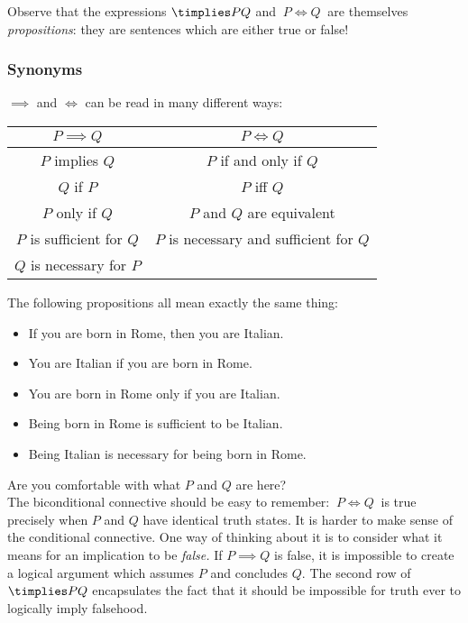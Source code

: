 \noindent Observe that the expressions $\timplies PQ$ and $\ P\iff Q\ $ are themselves \emph{propositions}: they are sentences which are either true or false!

\subsubsection*{Synonyms}

$\implies$ and $\iff$ can be read in many different ways:
\begin{center}
\begin{tabular}{c|c}
$P\implies Q$ & $P\iff Q$\\\hline
$P$ implies $Q$ & $P$ if and only if $Q$\\
$Q$ if $P$ & $P$ iff $Q$\\
$P$ only if $Q$ & $P$ and $Q$ are equivalent\\
$P$ is sufficient for $Q$ &$P$ is necessary and sufficient for $Q$\\
$Q$ is necessary for $P$ &
\end{tabular}
\end{center}

\begin{example}
The following propositions all mean exactly the same thing:
\begin{itemize}
\item If you are born in Rome, then you are Italian. 
\item You are Italian if you are born in Rome. 
\item You are born in Rome only if you are Italian. 
\item Being born in Rome is sufficient to be Italian. 
\item Being Italian is necessary for being born in Rome. 
\end{itemize}
\end{example}


\noindent Are you comfortable with what $P$ and $Q$ are here?\\

\noindent The biconditional connective should be easy to remember: $\ P\iff Q\ $ is true precisely when $P$ and $Q$ have identical truth states. It is harder to make sense of the conditional connective. One way of thinking about it is to consider what it means for an implication to be \emph{false.} If $P\implies Q$ is false, it is impossible to create a logical argument which assumes $P$ and concludes $Q$. The second row of $\timplies PQ$ encapsulates the fact that it should be impossible for truth ever to logically imply falsehood. 

